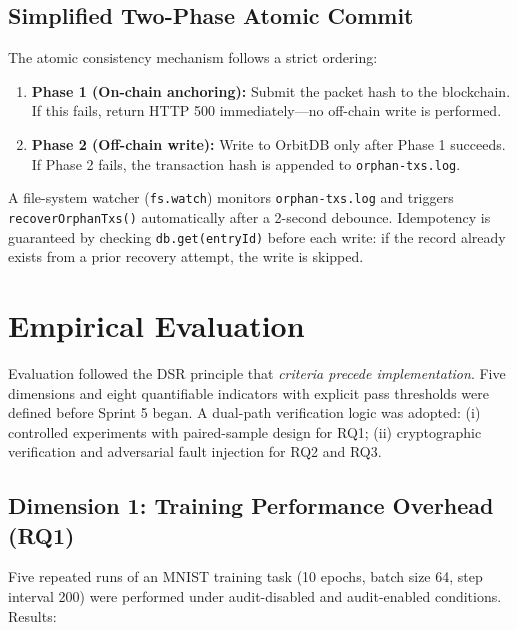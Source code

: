 \documentclass[10pt,twocolumn]{article}
\begin{document}
\subsection{Simplified Two-Phase Atomic Commit}

The atomic consistency mechanism follows a strict ordering:

\begin{enumerate}[leftmargin=*, nosep]
  \item \textbf{Phase 1 (On-chain anchoring):} Submit the packet hash to the blockchain.
        If this fails, return HTTP 500 immediately---no off-chain write is performed.
  \item \textbf{Phase 2 (Off-chain write):} Write to OrbitDB only after Phase 1 succeeds.
        If Phase 2 fails, the transaction hash is appended to \texttt{orphan-txs.log}.
\end{enumerate}

A file-system watcher (\texttt{fs.watch}) monitors \texttt{orphan-txs.log} and triggers
\texttt{recoverOrphanTxs()} automatically after a 2-second debounce. Idempotency is
guaranteed by checking \texttt{db.get(entryId)} before each write: if the record already
exists from a prior recovery attempt, the write is skipped.

\section{Empirical Evaluation}

Evaluation followed the DSR principle that \emph{criteria precede implementation}. Five
dimensions and eight quantifiable indicators with explicit pass thresholds were defined
before Sprint 5 began. A dual-path verification logic was adopted: (i) controlled
experiments with paired-sample design for RQ1; (ii) cryptographic verification and
adversarial fault injection for RQ2 and RQ3.

\subsection{Dimension 1: Training Performance Overhead (RQ1)}

Five repeated runs of an MNIST training task (10 epochs, batch size 64, step interval 200)
were performed under audit-disabled and audit-enabled conditions. Results:
\end{document}

